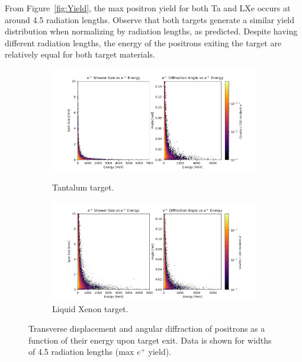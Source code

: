 \documentclass[%
reprint,
nofootinbib,
amsmath, amssymb,
aps,
floatfix,
]{revtex4-2}
\begin{document}

From Figure~\ref{fig:Yield}, the max positron yield for both Ta and LXe occurs at around 4.5 radiation lengths.
Observe that both targets generate a similar yield distribution when normalizing by
radiation lengths, as predicted.
Despite having different radiation lengths, the energy of the positrons exiting the
target are relatively equal for both target materials.

\begin{figure}[H]
    \begin{subfigure}{\linewidth}
        \includegraphics[width = \linewidth]{../images/TaHists.png}
        \caption{\label{fig:TaHists}Tantalum target.}
        \includegraphics[width = \linewidth]{../images/XeHists.png}
        \caption{\label{fig:XeHists}Liquid Xenon target.}
    \end{subfigure}
    \caption{\label{fig:Hists}Transverse displacement and angular diffraction of positrons as a function
    of their energy upon target exit.  Data is shown for widths of 4.5 radiation lengths (max $e^+$ yield).}
\end{figure}
\end{document}
